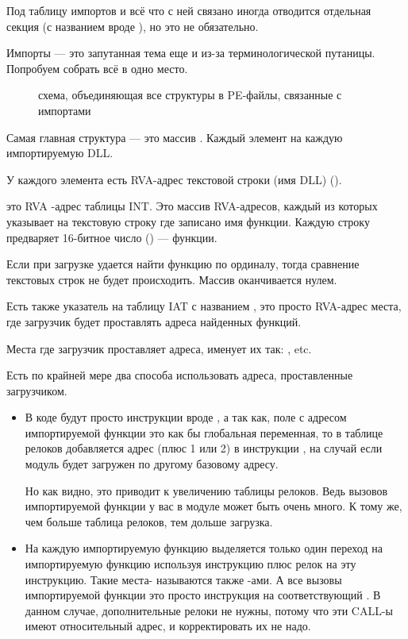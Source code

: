 
Под таблицу импортов и всё что с ней связано иногда отводится отдельная секция 
(с названием вроде ),
но это не обязательно.

Импорты --- это запутанная тема еще и из-за терминологической путаницы. Попробуем собрать всё в одно место.

\begin{figure}[H]
\centering
{}
\caption{схема, объединяющая все структуры в PE-файлы, связанные с импортами}
\end{figure}

Самая главная структура --- это массив .
Каждый элемент на каждую импортируемую DLL.

У каждого элемента есть \ac{RVA}-адрес текстовой строки (имя DLL) ().

 это \ac{RVA} -адрес таблицы \ac{INT}.
Это массив \ac{RVA}-адресов, каждый из которых указывает на текстовую строку где записано имя функции. 
Каждую строку предваряет 16-битное число () ---  функции.

Если при загрузке удается найти функцию по ординалу, тогда сравнение текстовых строк не будет происходить.
Массив оканчивается нулем.

Есть также указатель на таблицу \ac{IAT} с названием , это просто \ac{RVA}-адрес места, где загрузчик будет проставлять адреса найденных функций.

Места где загрузчик проставляет адреса, \IDA именует их так: , etc.

Есть по крайней мере два способа использовать адреса, проставленные загрузчиком.

\begin{itemize}
\item
В коде будут просто инструкции вроде , а так как, поле с адресом импортируемой функции это как бы глобальная переменная, 
то в таблице релоков добавляется адрес (плюс 1 или 2) в инструкции ,
на случай если модуль будет загружен по другому базовому адресу.

Но как видно, это приводит к увеличению таблицы релоков.
Ведь вызовов импортируемой функции у вас в модуле может быть очень много.
К тому же, чем больше таблица релоков, тем дольше загрузка.

\item
На каждую импортируемую функцию выделяется только один переход на импортируемую функцию используя
инструкцию \JMP плюс релок на эту инструкцию.
Такие места- называются также -ами.
А все вызовы импортируемой функции это просто инструкция \CALL на соответствующий .
В данном случае, дополнительные релоки не нужны, потому что эти CALL-ы имеют относительный адрес,
и корректировать их не надо.
\end{itemize}

